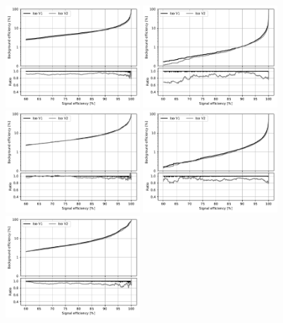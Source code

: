 \begin{figure}[!htb]
   \vspace*{0.3cm}
   \begin{center}
      \includegraphics[width=0.45\textwidth]{Figures/Electrons/2018_EB1_5_.pdf}
      \includegraphics[width=0.45\textwidth]{Figures/Electrons/2018_EB1_10_.pdf} \\
      \includegraphics[width=0.45\textwidth]{Figures/Electrons/2018_EB2_5_.pdf}
      \includegraphics[width=0.45\textwidth]{Figures/Electrons/2018_EB2_10_.pdf} \\
      \includegraphics[width=0.45\textwidth]{Figures/Electrons/2018_EE_5_.pdf}

\end{center}
\end{figure}
